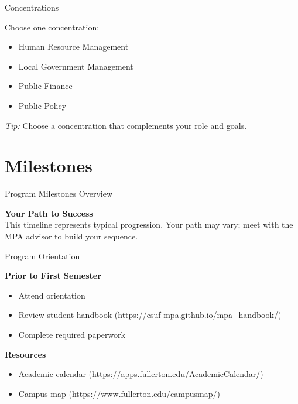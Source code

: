 \documentclass[10pt,aspectratio=169]{beamer}
\begin{document}
\begin{frame}{Concentrations}
\begin{Large}
Choose one concentration:
\begin{itemize}
  \item Human Resource Management
  \item Local Government Management
  \item Public Finance
  \item Public Policy
\end{itemize}
\emph{Tip:} Choose a concentration that complements your role and goals.
\end{Large}
\end{frame}

\section{\textcolor{titanorange}{Milestones}}
\begin{frame}{Program Milestones Overview}
\begin{Large}
\centering
\textbf{Your Path to Success}\\[4pt]
\small This timeline represents typical progression. Your path may vary; meet with the MPA advisor to build your sequence.
\end{Large}
\end{frame}

\begin{frame}{Program Orientation}
\begin{Large}
\textbf{Prior to First Semester}
\begin{itemize}
  \item Attend orientation
  \item Review student handbook \small(\url{https://csuf-mpa.github.io/mpa_handbook/})
  \item Complete required paperwork
\end{itemize}
\textbf{Resources}
\begin{itemize}
  \item Academic calendar \small(\url{https://apps.fullerton.edu/AcademicCalendar/})
  \item Campus map \small(\url{https://www.fullerton.edu/campusmap/})
\end{itemize}
\end{Large}
\end{frame}
\end{document}
